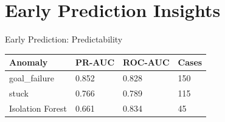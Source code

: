 \documentclass[aspectratio=169, 11pt]{beamer}
\begin{document}
\section{Early Prediction Insights}

\begin{frame}{Early Prediction: Predictability}
  \begin{table}
    \small
    \renewcommand{\arraystretch}{1.3}
    \begin{tabular}{@{}L{3.5cm} C{2.0cm} C{2.0cm} C{1.5cm}@{}}
      \toprule
      \textbf{Anomaly} & \textbf{PR-AUC} & \textbf{ROC-AUC} & \textbf{Cases} \\
      \midrule
      goal\_failure & 0.852 & 0.828 & 150 \\
      stuck & 0.766 & 0.789 & 115 \\
      Isolation Forest & 0.661 & 0.834 & 45 \\
      \bottomrule
    \end{tabular}
  \end{table}
\end{frame}
\end{document}
